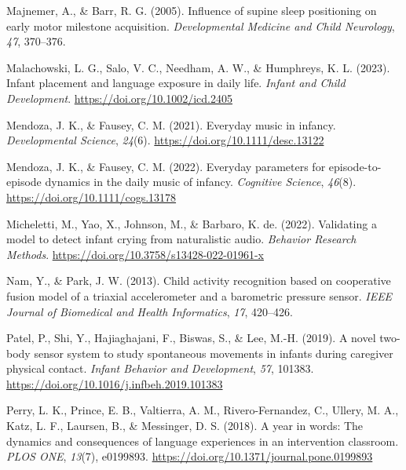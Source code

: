 \documentclass[
  man]{apa6}
\newlength{\cslhangindent}
\newlength{\cslentryspacingunit} %
\newenvironment{CSLReferences}[2] %
 {%
  \setlength{\parindent}{0pt}
  \ifodd #1
  \let\oldpar\par
  \def\par{\hangindent=\cslhangindent\oldpar}
  \fi
  \setlength{\parskip}{#2\cslentryspacingunit}
 }%
 {}
\begin{document}
\begin{CSLReferences}{1}{0}
\leavevmode{}%
Majnemer, A., \& Barr, R. G. (2005). Influence of supine sleep positioning on early motor milestone acquisition. \emph{Developmental Medicine and Child Neurology}, \emph{47}, 370--376.

\leavevmode{}%
Malachowski, L. G., Salo, V. C., Needham, A. W., \& Humphreys, K. L. (2023). Infant placement and language exposure in daily life. \emph{Infant and Child Development}. \url{https://doi.org/10.1002/icd.2405}

\leavevmode{}%
Mendoza, J. K., \& Fausey, C. M. (2021). Everyday music in infancy. \emph{Developmental Science}, \emph{24}(6). \url{https://doi.org/10.1111/desc.13122}

\leavevmode{}%
Mendoza, J. K., \& Fausey, C. M. (2022). Everyday parameters for episode-to-episode dynamics in the daily music of infancy. \emph{Cognitive Science}, \emph{46}(8). \url{https://doi.org/10.1111/cogs.13178}

\leavevmode{}%
Micheletti, M., Yao, X., Johnson, M., \& Barbaro, K. de. (2022). Validating a model to detect infant crying from naturalistic audio. \emph{Behavior Research Methods}. \url{https://doi.org/10.3758/s13428-022-01961-x}

\leavevmode{}%
Nam, Y., \& Park, J. W. (2013). Child activity recognition based on cooperative fusion model of a triaxial accelerometer and a barometric pressure sensor. \emph{IEEE Journal of Biomedical and Health Informatics}, \emph{17}, 420--426.

\leavevmode{}%
Patel, P., Shi, Y., Hajiaghajani, F., Biswas, S., \& Lee, M.-H. (2019). A novel two-body sensor system to study spontaneous movements in infants during caregiver physical contact. \emph{Infant Behavior and Development}, \emph{57}, 101383. \url{https://doi.org/10.1016/j.infbeh.2019.101383}

\leavevmode{}%
Perry, L. K., Prince, E. B., Valtierra, A. M., Rivero-Fernandez, C., Ullery, M. A., Katz, L. F., Laursen, B., \& Messinger, D. S. (2018). A year in words: The dynamics and consequences of language experiences in an intervention classroom. \emph{{PLOS} {ONE}}, \emph{13}(7), e0199893. \url{https://doi.org/10.1371/journal.pone.0199893}


\end{CSLReferences}
\end{document}
